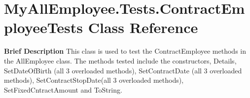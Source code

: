 \hypertarget{class_my_all_employee_1_1_tests_1_1_contract_employee_tests}{}\section{My\+All\+Employee.\+Tests.\+Contract\+Employee\+Tests Class Reference}
\label{class_my_all_employee_1_1_tests_1_1_contract_employee_tests}


{\bfseries  Brief Description} This class is used to test the Contract\+Employee methods in the All\+Employee class. The methods tested include the constructors, Details, Set\+Date\+Of\+Birth (all 3 overloaded methods), Set\+Contract\+Date (all 3 overloaded methods), Set\+Contract\+Stop\+Date(all 3 overloaded methods), Set\+Fixed\+Cntract\+Amount and To\+String.  


